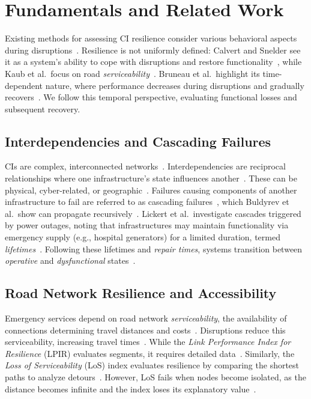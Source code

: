 
\section{Fundamentals and Related Work}
\label{sec:related_works}

Existing methods for assessing CI resilience consider various behavioral aspects during disruptions~\cite{calvert2017,kaub2024,lickert2024}.
Resilience is not uniformly defined: Calvert and Snelder see it as a system's ability to cope with disruptions and restore functionality~\cite{calvert2017}, while Kaub et al.\ focus on road \textit{serviceability}~\cite{kaub2024}.
Bruneau et al.\ highlight its time-dependent nature, where performance decreases during disruptions and gradually recovers~\cite{bruneau2003}.
We follow this temporal perspective, evaluating functional losses and subsequent recovery.

\subsection{Interdependencies and Cascading Failures}
\label{subsec:interdependencies-and-cascading-failures}
CIs are complex, interconnected networks~\cite{chiaradonna2007}.
Interdependencies are reciprocal relationships where one infrastructure's state influences another~\cite{laprie2007}.
These can be physical, cyber-related, or geographic~\cite{chiaradonna2007}.
Failures causing components of another infrastructure to fail are referred to as cascading failures~\cite{laprie2007}, which Buldyrev et al.\ show can propagate recursively~\cite{buldyrev2010}.
Lickert et al.\ investigate cascades triggered by power outages, noting that infrastructures may maintain functionality via emergency supply (e.g., hospital generators) for a limited duration, termed \textit{lifetimes}~\cite{lickert2024}.
Following these lifetimes and \textit{repair times}, systems transition between \textit{operative} and \textit{dysfunctional} states~\cite{lickert2024}.

\subsection{Road Network Resilience and Accessibility}
\label{subsec:road-network-resilience-and-accessibility}
Emergency services depend on road network \textit{serviceability}, the availability of connections determining travel distances and costs~\cite{kaub2024}.
Disruptions reduce this serviceability, increasing travel times~\cite{kaub2024}.
While the \textit{Link Performance Index for Resilience} (LPIR) evaluates segments, it requires detailed data~\cite{calvert2017}.
Similarly, the \textit{Loss of Serviceability} (LoS) index evaluates resilience by comparing the shortest paths to analyze detours~\cite{kaub2024}.
However, LoS fails when nodes become isolated, as the distance becomes infinite and the index loses its explanatory value~\cite{kaub2024}.

